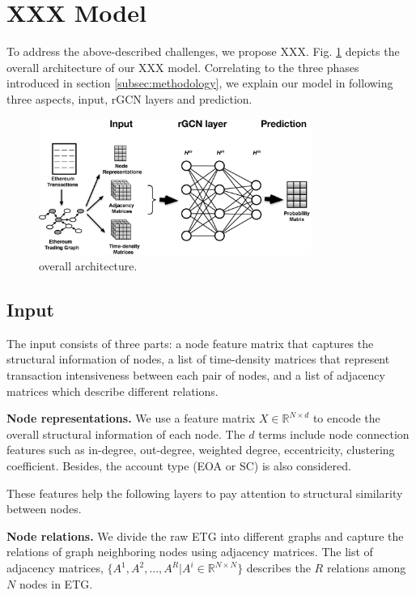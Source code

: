 
\section{XXX Model}
To address the above-described challenges, we propose XXX. Fig. \ref{fig:architecture} depicts the overall architecture of our XXX model. Correlating to the three phases introduced in section \ref{subsec:methodology}, we explain our model in following three aspects, input, rGCN layers and prediction.

\begin{figure}[htbp]
	\centering
	\label{fig:architecture}
	\includegraphics[width=3.5in]{fig/architecture.eps}
	\caption{overall architecture.}
\end{figure}


\subsection{Input}
\label{sec:input}
 The input consists of three parts: a node feature matrix that captures the structural information of nodes, a list of time-density matrices that represent transaction intensiveness between each pair of nodes, and a list of adjacency matrices which describe different relations.

\textbf{Node representations.} We use a feature matrix $X \in \mathbb{R}^{N \times d}$ to encode the overall structural information of each node. The $d$ terms include node connection features such as in-degree, out-degree, weighted degree, eccentricity, clustering coefficient. Besides, the account type (EOA or SC) is also considered.   

These features help the following layers to pay attention to structural similarity between nodes.

\textbf{Node relations.} We divide the raw ETG into different graphs and capture the relations of graph neighboring nodes using adjacency matrices. The list of adjacency matrices, $\{A^1,A^2,...,A^R|A^i\in \mathbb{R}^{N \times N}\}$ describes the $R$ relations among $N$ nodes in ETG.

